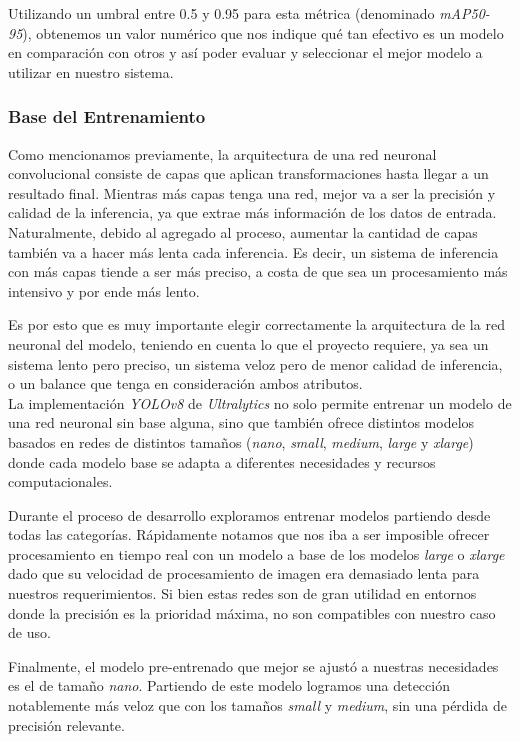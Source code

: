 \documentclass[a4paper]{article}
\begin{document}
Utilizando un umbral entre 0.5 y 0.95 para esta métrica (denominado \textit{mAP50-95}), obtenemos un valor numérico que nos indique qué tan efectivo es un modelo en comparación con otros y así poder evaluar y seleccionar el mejor modelo a utilizar en nuestro sistema.

\subsubsection{Base del Entrenamiento}

Como mencionamos previamente, la arquitectura de una red neuronal convolucional consiste de capas que aplican transformaciones hasta llegar a un resultado final. Mientras más capas tenga una red, mejor va a ser la precisión y calidad de la inferencia, ya que extrae más información de los datos de entrada. Naturalmente, debido al agregado al proceso, aumentar la cantidad de capas también va a hacer más lenta cada inferencia. Es decir, un sistema de inferencia con más capas tiende a ser más preciso, a costa de que sea un procesamiento más intensivo y por ende más lento.

Es por esto que es muy importante elegir correctamente la arquitectura de la red neuronal del modelo, teniendo en cuenta lo que el proyecto requiere, ya sea un sistema lento pero preciso, un sistema veloz pero de menor calidad de inferencia, o un balance que tenga en consideración ambos atributos. \\

La implementación \textit{YOLOv8} de \textit{Ultralytics} no solo permite entrenar un modelo de una red neuronal sin base alguna, sino que también ofrece distintos modelos basados en redes de distintos tamaños (\textit{nano}, \textit{small}, \textit{medium}, \textit{large} y \textit{xlarge}) donde cada modelo base se adapta a diferentes necesidades y recursos computacionales.

Durante el proceso de desarrollo exploramos entrenar modelos partiendo desde todas las categorías. Rápidamente notamos que nos iba a ser imposible ofrecer procesamiento en tiempo real con un modelo a base de los modelos \textit{large} o \textit{xlarge} dado que su velocidad de procesamiento de imagen era demasiado lenta para nuestros requerimientos. Si bien estas redes son de gran utilidad en entornos donde la precisión es la prioridad máxima, no son compatibles con nuestro caso de uso.

Finalmente, el modelo pre-entrenado que mejor se ajustó a nuestras necesidades es el de tamaño \textit{nano}. Partiendo de este modelo logramos una detección notablemente más veloz que con los tamaños \textit{small} y \textit{medium}, sin una pérdida de precisión relevante.
\end{document}
